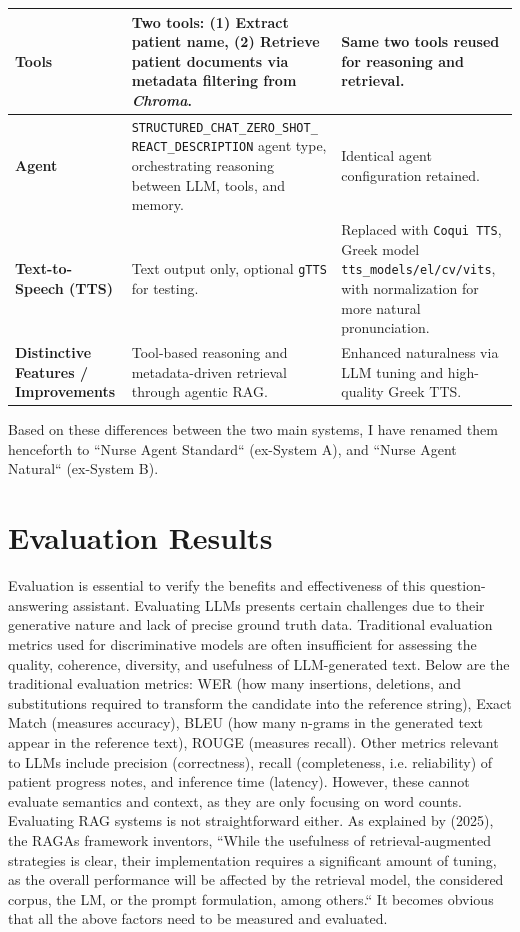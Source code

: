 \begin{longtable}{|p{3cm}|p{6.5cm}|p{6.5cm}|}
\textbf{Tools} &
Two tools: (1) Extract patient name, (2) Retrieve patient documents via metadata filtering from \textit{Chroma}. &
Same two tools reused for reasoning and retrieval. \\
\hline

\textbf{Agent} &
\texttt{STRUCTURED\_CHAT\_ZERO\_SHOT\_
REACT\_DESCRIPTION} agent type, orchestrating reasoning between LLM, tools, and memory. &
Identical agent configuration retained. \\
\hline

\textbf{Text-to-Speech (TTS)} &
Text output only, optional \texttt{gTTS} for testing. &
Replaced with \texttt{Coqui TTS}, Greek model \texttt{tts\_models/el/cv/vits}, with normalization for more natural pronunciation. \\
\hline

\textbf{Distinctive Features / Improvements} &
Tool-based reasoning and metadata-driven retrieval through agentic RAG. &
Enhanced naturalness via LLM tuning and high-quality Greek TTS. \\
\hline

\end{longtable}

Based on these differences between the two main systems, I have renamed them henceforth to ``Nurse Agent Standard`` (ex-System A), and ``Nurse Agent Natural`` (ex-System B).

\section{Evaluation Results}
Evaluation is essential to verify the benefits and effectiveness of this question-answering assistant. Evaluating LLMs presents certain challenges due to their generative nature and lack of precise ground truth data. Traditional evaluation metrics used for discriminative models are often insufficient for assessing the quality, coherence, diversity, and usefulness of LLM-generated text. Below are the traditional evaluation metrics: WER (how many insertions, deletions, and substitutions required to transform the candidate into the reference string), Exact Match (measures accuracy), BLEU (how many n-grams in the generated text appear in the reference text), ROUGE (measures recall). Other metrics relevant to LLMs include precision (correctness), recall (completeness, i.e. reliability) of patient progress notes, and inference time (latency). However, these cannot evaluate semantics and context, as they are only focusing on word counts. Evaluating RAG systems is not straightforward either. As explained by \citeauthor{ragas2025} (2025), the RAGAs framework inventors, ``While the usefulness of retrieval-augmented strategies is clear, their implementation requires a significant amount of tuning, as the overall performance will be affected by the retrieval model, the considered corpus, the LM, or the prompt formulation, among others.`` It becomes obvious that all the above factors need to be measured and evaluated. 

